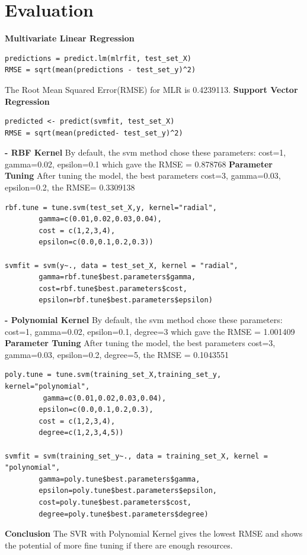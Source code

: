 \documentclass[11pt]{article}
\begin{document}
\section{Evaluation}
\textbf{Multivariate Linear Regression}
\begin{lstlisting}
predictions = predict.lm(mlrfit, test_set_X)
RMSE = sqrt(mean(predictions - test_set_y)^2)
\end{lstlisting}
The Root Mean Squared Error(RMSE) for MLR is 0.4239113. \newline\newline
\textbf{Support Vector Regression}
\begin{lstlisting}
predicted <- predict(svmfit, test_set_X)
RMSE = sqrt(mean(predicted- test_set_y)^2)
\end{lstlisting}
\textbf{- RBF Kernel}\newline
By default, the svm method chose these parameters: cost=1, gamma=0.02, epsilon=0.1 which gave the RMSE = 0.878768
\newline
\textbf{Parameter Tuning}\newline
After tuning the model, the best parameters cost=3, gamma=0.03, epsilon=0.2, the RMSE= 0.3309138
\begin{lstlisting}
rbf.tune = tune.svm(test_set_X,y, kernel="radial",
		gamma=c(0.01,0.02,0.03,0.04),
		cost = c(1,2,3,4),
		epsilon=c(0.0,0.1,0.2,0.3))

svmfit = svm(y~., data = test_set_X, kernel = "radial",
		gamma=rbf.tune$best.parameters$gamma,
		cost=rbf.tune$best.parameters$cost,
		epsilon=rbf.tune$best.parameters$epsilon)
\end{lstlisting}
\textbf{- Polynomial Kernel}\newline
By default, the svm method chose these parameters: cost=1, gamma=0.02, epsilon=0.1, degree=3 which gave the RMSE = 1.001409\newline
\textbf{Parameter Tuning}\newline
After tuning the model, the best parameters cost=3, gamma=0.03, epsilon=0.2, degree=5, the RMSE = 0.1043551
\begin{lstlisting}
poly.tune = tune.svm(training_set_X,training_set_y, kernel="polynomial",
		 gamma=c(0.01,0.02,0.03,0.04),
		epsilon=c(0.0,0.1,0.2,0.3),
		cost = c(1,2,3,4),
		degree=c(1,2,3,4,5))

svmfit = svm(training_set_y~., data = training_set_X, kernel = "polynomial", 
		gamma=poly.tune$best.parameters$gamma, 
		epsilon=poly.tune$best.parameters$epsilon,
		cost=poly.tune$best.parameters$cost,
		degree=poly.tune$best.parameters$degree)
\end{lstlisting}
\textbf{Conclusion}
\newline The SVR with Polynomial Kernel gives the lowest RMSE and shows the potential of more fine tuning if there are enough resources.
\end{document}
